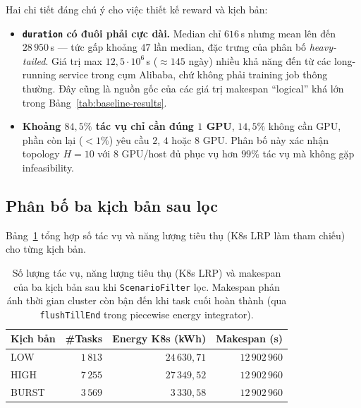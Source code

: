 Hai chi tiết đáng chú ý cho việc thiết kế reward và kịch bản:
\begin{itemize}
  \item \textbf{\texttt{duration} có đuôi phải cực dài.} Median chỉ
        $616$\,s nhưng mean lên đến $28\,950$\,s --- tức gấp khoảng
        $47$ lần median, đặc trưng của phân bố \emph{heavy-tailed}.
        Giá trị max $12{,}5 \cdot 10^6$\,s ($\approx 145$ ngày) nhiều
        khả năng đến từ các long-running service trong cụm Alibaba,
        chứ không phải training job thông thường. Đây cũng là nguồn
        gốc của các giá trị makespan ``logical'' khá lớn trong
        Bảng~\ref{tab:baseline-results}.
  \item \textbf{Khoảng $84{,}5\%$ tác vụ chỉ cần đúng $1$ GPU},
        $14{,}5\%$ không cần GPU, phần còn lại ($< 1\%$) yêu cầu
        $2$, $4$ hoặc $8$ GPU. Phân bố này xác nhận topology $H = 10$
        với $8$ GPU/host đủ phục vụ hơn $99\%$ tác vụ mà không gặp
        infeasibility.
\end{itemize}

\subsection{Phân bố ba kịch bản sau lọc}

Bảng~\ref{tab:scenario-stats} tổng hợp số tác vụ và năng lượng tiêu
thụ (K8s LRP làm tham chiếu) cho từng kịch bản.

\begin{table}[H]
  \centering
  \caption{Số lượng tác vụ, năng lượng tiêu thụ (K8s LRP) và makespan
  của ba kịch bản sau khi \texttt{ScenarioFilter} lọc. Makespan phản
  ánh thời gian cluster còn bận đến khi task cuối hoàn thành (qua
  \texttt{flushTillEnd} trong piecewise energy integrator).}
  \label{tab:scenario-stats}
  \footnotesize
  \begin{tabular}{lrrr}
    \toprule
    \textbf{Kịch bản} & \textbf{\#Tasks}
                       & \textbf{Energy K8s (kWh)} & \textbf{Makespan (s)} \\
    \midrule
    LOW   & $1\,813$ & $24\,630{,}71$ & $12\,902\,960$ \\
    HIGH  & $7\,255$ & $27\,349{,}52$ & $12\,902\,960$ \\
    BURST & $3\,569$ &  $3\,330{,}58$ & $12\,902\,960$ \\
    \bottomrule
  \end{tabular}
\end{table}


